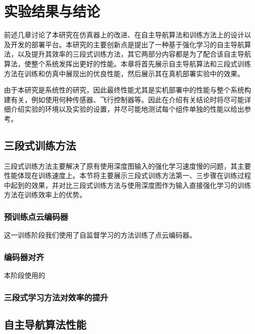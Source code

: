 
\chapter{实验结果与结论}
\label{result}

前述几章讨论了本研究在仿真器上的改进、在自主导航算法和训练方法上的设计以及开发的部署平台。本研究的主要创新点是提出了一种基于强化学习的自主导航算法，以及提升其效率的三段式训练方法，其它两部分内容都是为了配合该自主导航算法，使整个系统发挥出更好的性能。本章将首先展示自主导航算法和三段式训练方法在训练和仿真中展现出的优良性能，然后展示其在真机部署实验中的效果。

由于本研究是系统性的研究，因此最终性能尤其是实机部署中的性能与整个系统构建有关，例如使用何种传感器、飞行控制器等。因此在介绍有关结论时将尽可能详细介绍实验的环境以及实验的设置，并尽可能地测试每个组件单独的性能以给出参考。

\section{三段式训练方法}

三段式训练方法主要解决了原有使用深度图输入的强化学习速度慢的问题，其主要性能体现在训练速度上。本节将主要展示三段式训练方法第一、三步骤在训练过程中起到的效果，并对比三段式训练方法与使用深度图作为输入直接强化学习的训练方法在训练效率上的优势。

\subsection{预训练点云编码器}

这一训练阶段我们使用了自监督学习的方法训练了点云编码器。

\subsection{编码器对齐}

本阶段使用的

\subsection{三段式学习方法对效率的提升}


\section{自主导航算法性能}

